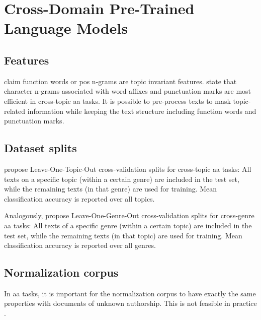 \section{Cross-Domain Pre-Trained Language Models}
\label{sec:cross_domain_pre_trained_LM}

\subsection{Features}
\citep{barlas_cross_domain_2020} claim function words or \ac{pos} n-grams are topic invariant features.
\citep{barlas_cross_domain_2020} state that character n-grams associated with word affixes and punctuation marks 
are most efficient in cross-topic \ac{aa} tasks.
It is possible to pre-process texts to mask topic-related information while keeping the text structure including 
function words and punctuation marks.

\subsection{Dataset splits}
\label{sec:dataset_splits}

\citet{barlas_cross_domain_2020} propose Leave-One-Topic-Out cross-validation splits for cross-topic \ac{aa} tasks:
All texts on a specific topic (within a certain genre) are included in the test set,
while the remaining texts (in that genre) are used for training.
Mean classification accuracy is reported over all topics.

Analogously, \citet{barlas_cross_domain_2020} propose Leave-One-Genre-Out cross-validation splits for cross-genre \ac{aa} tasks:
All texts of a specific genre (within a certain topic) are included in the test set,
while the remaining texts (in that topic) are used for training.
Mean classification accuracy is reported over all genres.

\subsection{Normalization corpus} 
\label{sec:normalization_corpus}

In \ac{aa} tasks, it is important for the normalization corpus to have 
exactly the same properties with documents of unknown authorship.
This is not feasible in practice \citep{barlas_cross_domain_2020}.